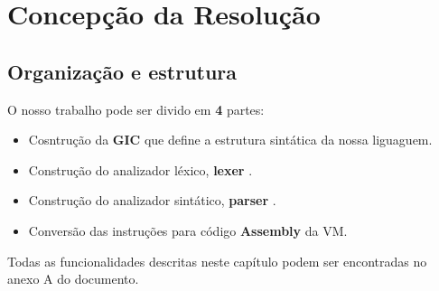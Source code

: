 \documentclass[11pt,a4paper]{report}%
\begin{document}
\newpage

\chapter{Concepção da Resolução}
\section{Organização e estrutura}
O nosso trabalho pode ser divido em \textbf{4} partes:
\begin{itemize}
\item Cosntrução da \textbf{GIC} que define a estrutura sintática da nossa liguaguem.
\item Construção do analizador léxico, \textbf{lexer} .
\item Construção do analizador sintático, \textbf{parser} .
\item Conversão das instruções para código \textbf{Assembly} da  VM.    
\end{itemize}
Todas as funcionalidades descritas neste capítulo podem ser encontradas no anexo A do documento. \\ \\
\end{document}
